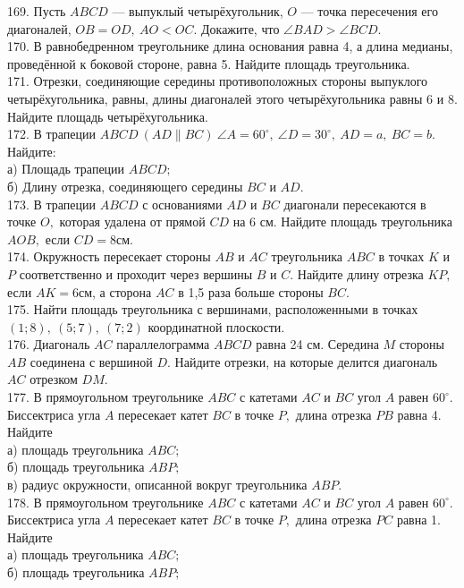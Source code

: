\documentclass[12pt]{article}
\begin{document}
169. Пусть $ABCD$ --- выпуклый четырёхугольник, $O$ --- точка пересечения его диагоналей, $OB=OD,\ AO<OC.$ Докажите, что $\angle BAD > \angle BCD.$\\
170. В равнобедренном треугольнике длина основания равна 4, а длина медианы, проведённой к боковой стороне, равна 5. Найдите площадь треугольника.\\
171. Отрезки, соединяющие середины противоположных стороны выпуклого четырёхугольника, равны, длины диагоналей этого четырёхугольника равны 6 и 8. Найдите площадь четырёхугольника.\\
172. В трапеции $ABCD\ (AD\parallel BC)\ \angle A=60^\circ,\ \angle D=30^\circ,\ AD=a,\ BC=b.$ Найдите:\\
а) Площадь трапеции $ABCD;$\\
б) Длину отрезка, соединяющего середины $BC$ и $AD.$\\
173. В трапеции $ABCD$ с основаниями $AD$ и $BC$ диагонали пересекаются в точке $O,$ которая удалена от прямой $CD$ на 6 см. Найдите площадь треугольника $AOB,$ если $CD=8$см.\\
174. Окружность пересекает стороны $AB$ и $AC$ треугольника $ABC$ в точках $K$ и $P$ соответственно и проходит через вершины $B$ и $C.$ Найдите длину отрезка $KP,$ если $AK=6$см, а сторона $AC$ в 1,5 раза больше стороны $BC.$\\
175. Найти площадь треугольника с вершинами, расположенными в точках $(1;8),\ (5;7),\ (7;2)$ координатной плоскости.\\
176. Диагональ $AC$ параллелограмма $ABCD$ равна 24 см. Середина $M$ стороны $AB$ соединена с вершиной $D.$ Найдите отрезки, на которые делится диагональ $AC$ отрезком $DM.$\\
177. В прямоугольном треугольнике $ABC$ с катетами $AC$ и $BC$ угол $A$ равен $60^\circ.$ Биссектриса угла $A$ пересекает катет $BC$ в точке $P,$ длина отрезка $PB$ равна 4. Найдите\\
а) площадь треугольника $ABC;$\\
б) площадь треугольника $ABP;$\\
в) радиус окружности, описанной вокруг треугольника $ABP.$\\
178. В прямоугольном треугольнике $ABC$ с катетами $AC$ и $BC$ угол $A$ равен $60^\circ.$ Биссектриса угла $A$ пересекает катет $BC$ в точке $P,$ длина отрезка $PC$ равна 1. Найдите\\
а) площадь треугольника $ABC;$\\
б) площадь треугольника $ABP;$\\
\end{document}
